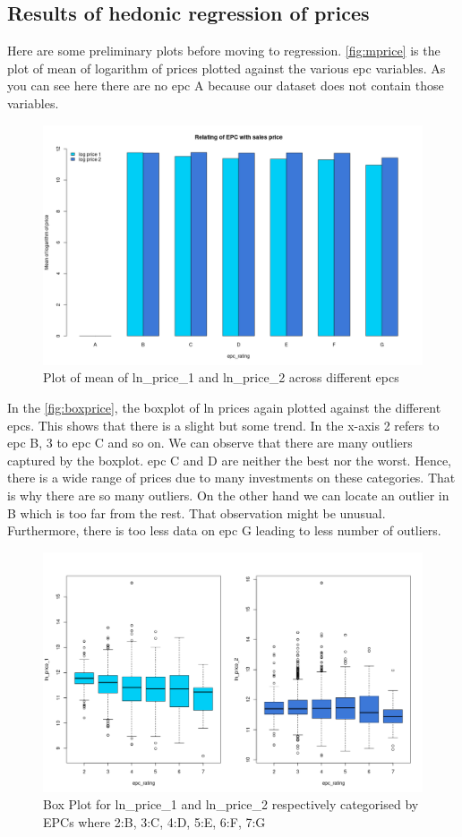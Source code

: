 \documentclass[12pt]{article}
\begin{document}
\subsection{Results of hedonic regression of prices}
Here are some preliminary plots before moving to regression. \autoref{fig:mprice} is the plot of mean of logarithm of prices plotted against the various \acrshort{epc} variables. As you can see here there are no \acrshort{epc} A because our dataset does not contain those variables.
\begin{figure}[H]
    \centering
    \includegraphics[width=12cm]{3.2. images/Rplot7.png}
    \caption{Plot of mean of ln\_price\_1 and ln\_price\_2 across different \acrshort{epc}s}
    \label{fig:mprice}
\end{figure}
In the \autoref{fig:boxprice}, the boxplot of ln prices again plotted against the different \acrshort{epc}s. This shows that there is a slight but some trend. In the x-axis 2 refers to \acrshort{epc} B, 3 to \acrshort{epc} C and so on. We can observe that there are many outliers captured by the boxplot. \acrshort{epc} C and D are neither the best nor the worst. Hence, there is a wide range of prices due to many investments on these categories. That is why there are so many outliers. On the other hand we can locate an outlier in B which is too far from the rest. That observation might be unusual. Furthermore, there is too less data on \acrshort{epc} G leading to less number of outliers.
\begin{figure}[H]
    \centering
    \includegraphics[width=16cm]{3.2. images/Rplot6.png}
    \caption{Box Plot for ln\_price\_1 and ln\_price\_2 respectively categorised by EPCs where 2:B, 3:C, 4:D, 5:E, 6:F, 7:G}
    \label{fig:boxprice}
\end{figure}
\end{document}
